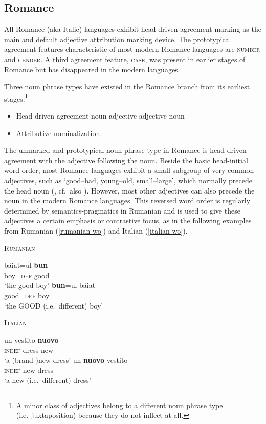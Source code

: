 \subsection{Romance}
All Romance (aka Italic) languages exhibit head-driven agreement marking as the main and default adjective attribution marking device. The prototypical agreement features characteristic of most modern Romance languages are \textsc{number} and \textsc{gender}. A third agreement feature, \textsc{case}, was present in earlier stages of Romance but has disappeared in the modern languages.

Three noun phrase types have existed in the Romance branch from its earliest stages:\footnote{A minor class of adjectives belong to a different noun phrase type (i.e.~juxtaposition) because they do not inflect at all.}
\begin{itemize}
\item{Head-driven agreement}
	\subitem noun-adjective
	\subitem adjective-noun
\item{Attributive nominalization.}
\end{itemize}
The unmarked and prototypical noun phrase type in Romance is head-driven agreement with the adjective following the noun. Beside the basic head-initial word order, most Romance languages exhibit a small subgroup of very common adjectives, such as ‘good–bad, young–old, small–large’, which normally precede the head noun (\citealt[146–147]{posner1996}, cf.~also \citealt[340]{silvestri1998}). However, most other adjectives can also precede the noun in the modern Romance languages. This reversed word order is regularly determined by semantics-pragmatics in Rumanian and is used to give these adjectives a certain emphasis or contrastive focus, as in the following examples from Rumanian (\ref{rumanian wo}) and Italian (\ref{italian wo}).
\begin{exe}
\ex
\begin{xlist} 
\ex	\textsc{Rumanian} \citep{beyer-etal1987} \label{rumanian wo} 
\begin{xlist}
\ex	
\gll	băiat=ul \textbf{bun}\\
	boy=\textsc{def} good\\
\glt	‘the good boy’
\ex	
\gll	\textbf{bun}=ul băiat\\
	good=\textsc{def} boy\\
\glt	‘the GOOD (i.e.~different) boy’ 
\end{xlist}
\ex \textsc{Italian} \cite[146]{posner1996} \label{italian wo}
\begin{xlist}
\ex	
\gll	un vestito \textbf{nuovo}\\
	\textsc{indef} dress new\\
\glt	‘a (brand-)new dress’
\ex	
\gll	un \textbf{nuovo} vestito\\
	\textsc{indef} new dress\\
\glt	‘a new (i.e.~different) dress’
\end{xlist}
\end{xlist}
\end{exe}
